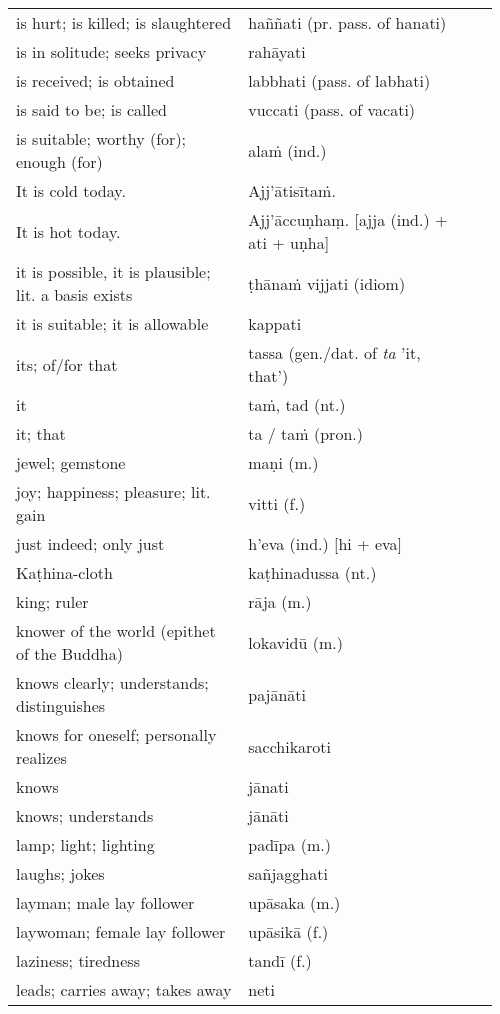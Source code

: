 \documentclass[a5paper]{memoir}
\begin{document}
\begin{longtable}{L{0.48\linewidth} L{0.48\linewidth} H}
is hurt; is killed; is slaughtered & haññati (pr. pass. of hanati) & \\[0pt]
is in solitude; seeks privacy & rahāyati & \\[0pt]
is received; is obtained & labbhati (pass. of labhati) & \\[0pt]
is said to be; is called & vuccati (pass. of vacati) & \\[0pt]
is suitable; worthy (for); enough (for) & alaṁ (ind.) & \\[0pt]
It is cold today. & Ajj'ātisītaṁ. & \\[0pt]
It is hot today. & Ajj'āccuṇhaṃ. [ajja (ind.) + ati  + uṇha] & \\[0pt]
it is possible, it is plausible; lit. a basis exists & ṭhānaṁ vijjati (idiom) & \\[0pt]
it is suitable; it is allowable & kappati & \\[0pt]
its; of/for that & tassa (gen./dat. of \emph{ta} 'it, that') & \\[0pt]
it & taṁ, tad (nt.) & \\[0pt]
it; that & ta / taṁ (pron.) & \\[0pt]
jewel; gemstone & maṇi (m.) & \\[0pt]
joy; happiness; pleasure; lit. gain & vitti (f.) & \\[0pt]
just indeed; only just & h'eva (ind.) [hi + eva] & \\[0pt]
Kaṭhina-cloth & kaṭhinadussa (nt.) & \\[0pt]
king; ruler & rāja (m.) & \\[0pt]
knower of the world (epithet of the Buddha) & lokavidū (m.) & \\[0pt]
knows clearly; understands; distinguishes & pajānāti & \\[0pt]
knows for oneself; personally realizes & sacchikaroti & \\[0pt]
knows & jānati & \\[0pt]
knows; understands & jānāti & \\[0pt]
lamp; light; lighting & padīpa (m.) & \\[0pt]
laughs; jokes & sañjagghati & \\[0pt]
layman; male lay follower & upāsaka (m.) & \\[0pt]
laywoman; female lay follower & upāsikā (f.) & \\[0pt]
laziness; tiredness & tandī (f.) & \\[0pt]
leads; carries away; takes away & neti & \\[0pt]

\end{longtable}
\end{document}

